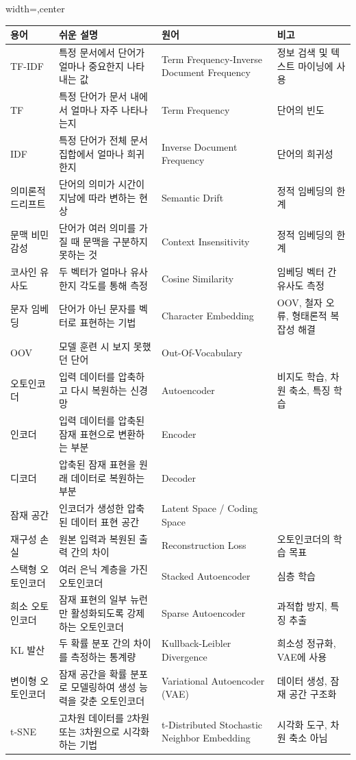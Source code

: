 \documentclass[11pt,a4paper]{article}
\begin{document}
\begin{adjustbox}{width=\textwidth,center}
\begin{tabular}{llll}
\toprule
\textbf{용어} & \textbf{쉬운 설명} & \textbf{원어} & \textbf{비고} \\
\midrule
TF-IDF & 특정 문서에서 단어가 얼마나 중요한지 나타내는 값 & Term Frequency-Inverse Document Frequency & 정보 검색 및 텍스트 마이닝에 사용 \\
TF & 특정 단어가 문서 내에서 얼마나 자주 나타나는지 & Term Frequency & 단어의 빈도 \\
IDF & 특정 단어가 전체 문서 집합에서 얼마나 희귀한지 & Inverse Document Frequency & 단어의 희귀성 \\
의미론적 드리프트 & 단어의 의미가 시간이 지남에 따라 변하는 현상 & Semantic Drift & 정적 임베딩의 한계 \\
문맥 비민감성 & 단어가 여러 의미를 가질 때 문맥을 구분하지 못하는 것 & Context Insensitivity & 정적 임베딩의 한계 \\
코사인 유사도 & 두 벡터가 얼마나 유사한지 각도를 통해 측정 & Cosine Similarity & 임베딩 벡터 간 유사도 측정 \\
문자 임베딩 & 단어가 아닌 문자를 벡터로 표현하는 기법 & Character Embedding & OOV, 철자 오류, 형태론적 복잡성 해결 \\
OOV & 모델 훈련 시 보지 못했던 단어 & Out-Of-Vocabulary & \\
오토인코더 & 입력 데이터를 압축하고 다시 복원하는 신경망 & Autoencoder & 비지도 학습, 차원 축소, 특징 학습 \\
인코더 & 입력 데이터를 압축된 잠재 표현으로 변환하는 부분 & Encoder & \\
디코더 & 압축된 잠재 표현을 원래 데이터로 복원하는 부분 & Decoder & \\
잠재 공간 & 인코더가 생성한 압축된 데이터 표현 공간 & Latent Space / Coding Space & \\
재구성 손실 & 원본 입력과 복원된 출력 간의 차이 & Reconstruction Loss & 오토인코더의 학습 목표 \\
스택형 오토인코더 & 여러 은닉 계층을 가진 오토인코더 & Stacked Autoencoder & 심층 학습 \\
희소 오토인코더 & 잠재 표현의 일부 뉴런만 활성화되도록 강제하는 오토인코더 & Sparse Autoencoder & 과적합 방지, 특징 추출 \\
KL 발산 & 두 확률 분포 간의 차이를 측정하는 통계량 & Kullback-Leibler Divergence & 희소성 정규화, VAE에 사용 \\
변이형 오토인코더 & 잠재 공간을 확률 분포로 모델링하여 생성 능력을 갖춘 오토인코더 & Variational Autoencoder (VAE) & 데이터 생성, 잠재 공간 구조화 \\
t-SNE & 고차원 데이터를 2차원 또는 3차원으로 시각화하는 기법 & t-Distributed Stochastic Neighbor Embedding & 시각화 도구, 차원 축소 아님 \\
\bottomrule
\end{tabular}
\end{adjustbox}
\end{document}
